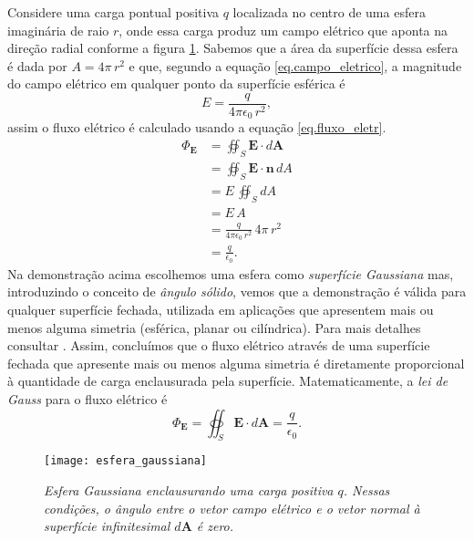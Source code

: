 Considere uma carga pontual positiva $q$ localizada no centro de uma esfera imaginária de raio $r$, onde essa carga produz um campo elétrico que aponta na direção radial conforme a figura \ref{fig.esfe_gauss}. Sabemos que a área da superfície dessa esfera é dada por $A=4\pi\,r^2$ e que, segundo a equação \ref{eq.campo_eletrico}, a magnitude do campo elétrico em qualquer ponto da superfície esférica é
\begin{equation*}
E=\frac{q}{4\pi\epsilon_0\,r^2},
\end{equation*}
assim o fluxo elétrico é calculado usando a equação \ref{eq.fluxo_eletr}.
\begin{align*}
\Phi_\textbf{E}&=\oiint_S\textbf{E}\cdot\textit{d}\textbf{A}\\
&=\oiint_S\textbf{E}\cdot\textbf{n}\,\textit{d}A\\
&=E\,\oiint_S\textit{d}A\\
&=E\,A\\
&=\frac{q}{4\pi\epsilon_0\,r^2}\,4\pi\,r^2\\
&=\frac{q}{\epsilon_0}.
\end{align*}
Na demonstração acima escolhemos uma esfera como \textit{superfície Gaussiana} mas, introduzindo o conceito de \textit{ângulo sólido}, vemos que a demonstração é válida para qualquer superfície fechada, utilizada em aplicações que apresentem mais ou menos alguma simetria (esférica, planar ou cilíndrica). Para mais detalhes consultar \cite{jackson_classical_1999}. Assim, concluímos que o fluxo elétrico através de uma superfície fechada que apresente mais ou menos alguma simetria é diretamente proporcional à quantidade de carga enclausurada pela superfície. Matematicamente, a \textit{lei de Gauss} para o fluxo elétrico é
\begin{equation}\label{eq.fluxo_eletrico}
\Phi_\textbf{E}=\oiint_S\textbf{E}\cdot\textit{d}\textbf{A}=\frac{q}{\epsilon_0}.
\end{equation}
\begin{figure}[!htb]
\centering
\texttt{[image: esfera\_gaussiana]}
\caption{\textit{Esfera Gaussiana enclausurando uma carga positiva $q$. Nessas condições, o ângulo entre o vetor campo elétrico e o vetor normal à superfície infinitesimal $d\textbf{A}$ é zero.}}
\label{fig.esfe_gauss}
\end{figure}

